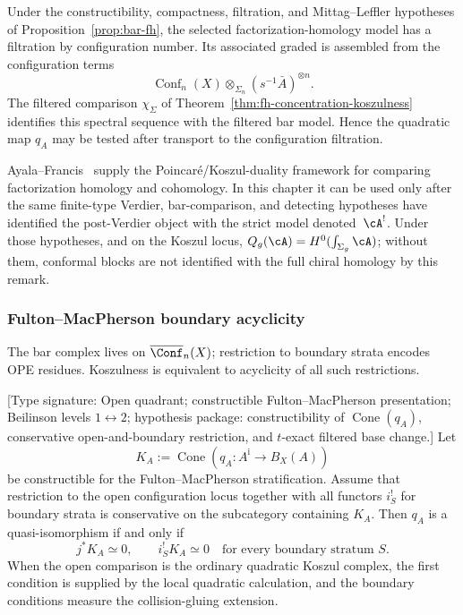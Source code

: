 \begin{remark}
\label{rem:goodwillie-tower-fh}
Under the constructibility, compactness, filtration, and
Mittag--Leffler hypotheses of
Proposition~\ref{prop:bar-fh}, the selected factorization-homology
model has a filtration by configuration number.  Its associated
graded is assembled from the configuration terms
\[
\operatorname{Conf}_n(X)\otimes_{\Sigma_n}
(s^{-1}\bar A)^{\otimes n}.
\]
The filtered comparison \(\chi_\Sigma\) of
Theorem~\ref{thm:fh-concentration-koszulness} identifies this
spectral sequence with the filtered bar model.  Hence the quadratic
map \(q_A\) may be tested after transport to the configuration
filtration.
\end{remark}

\begin{remark}\label{rem:ayala-francis-poincare-koszul}
Ayala--Francis~\cite{AF15} supply the Poincar\'e/Koszul-duality
framework for comparing factorization homology and cohomology. In this
chapter it can be used only after the same finite-type Verdier,
bar-comparison, and detecting hypotheses have identified the
post-Verdier object with the strict model denoted~\(\cA^!\). Under
those hypotheses, and on the Koszul locus,
\(Q_g(\cA)=H^0(\int_{\Sigma_g}\cA)\); without them, conformal blocks are
not identified with the full chiral homology by this remark.
\end{remark}

\medskip

\subsubsection{Fulton--MacPherson boundary acyclicity}

The bar complex lives on $\overline{\Conf}_n(X)$; restriction to
boundary strata encodes OPE residues. Koszulness is equivalent
to acyclicity of all such restrictions.

\begin{theorem}
\label{thm:fm-boundary-acyclicity}
\textup{[Type signature: Open quadrant; constructible
Fulton--MacPherson presentation; Beilinson levels
\(1\leftrightarrow2\); hypothesis package: constructibility of
\(\operatorname{Cone}(q_A)\), conservative open-and-boundary
restriction, and \(t\)-exact filtered base change.]}
Let
\[
K_A:=\operatorname{Cone}\!\left(
q_A\colon A^{\mathrm i}\longrightarrow B_X(A)\right)
\]
be constructible for the Fulton--MacPherson stratification.  Assume
that restriction to the open configuration locus together with all
functors \(i_S^!\) for boundary strata is conservative on the
subcategory containing \(K_A\).  Then \(q_A\) is a quasi-isomorphism
if and only if
\[
j^*K_A\simeq0,
\qquad
i_S^!K_A\simeq0
\quad\text{for every boundary stratum }S.
\]
When the open comparison is the ordinary quadratic Koszul complex,
the first condition is supplied by the local quadratic calculation,
and the boundary conditions measure the collision-gluing extension.
\end{theorem}

